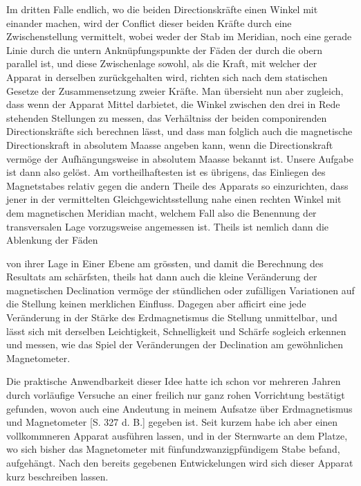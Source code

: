 Im dritten Falle endlich, wo die beiden Directionskräfte einen Winkel mit einander machen, wird der Conflict dieser beiden Kräfte durch eine Zwischenstellung vermittelt, wobei weder der Stab im Meridian, noch eine gerade Linie durch die untern Anknüpfungspunkte der Fäden der durch die obern parallel ist, und diese Zwischenlage sowohl, als die Kraft, mit welcher der Apparat in derselben zurückgehalten wird, richten sich nach dem statischen Gesetze der Zusammensetzung zweier Kräfte. Man übersieht nun aber zugleich, dass wenn der Apparat Mittel darbietet, die Winkel zwischen den drei in Rede stehenden Stellungen zu messen, das Verhältniss der beiden componirenden Directionskräfte sich berechnen lässt, und dass man folglich auch die magnetische Directionskraft in absolutem Maasse angeben kann, wenn die Directionskraft vermöge der Aufhängungsweise in absolutem Maasse bekannt ist. Unsere Aufgabe ist dann also gelöst. Am vortheilhaftesten ist es übrigens, das Einliegen des Magnetstabes relativ gegen die andern Theile des Apparats so einzurichten, dass jener in der vermittelten Gleichgewichtsstellung nahe einen rechten Winkel mit dem magnetischen Meridian macht, welchem Fall also die Benennung der transversalen Lage vorzugsweise angemessen ist. Theils ist nemlich dann die Ablenkung der Fäden
\par{}
\par\clearpage
{}
\noindent von ihrer Lage in Einer Ebene am grössten, und damit die Berechnung des Resultats am schärfsten, theils hat dann auch die kleine Veränderung der magnetischen Declination vermöge der stündlichen oder zufälligen Variationen auf die Stellung keinen merklichen Einfluss. Dagegen aber afficirt eine jede Veränderung in der Stärke des Erdmagnetismus die Stellung unmittelbar, und lässt sich mit derselben Leichtigkeit, Schnelligkeit und Schärfe sogleich erkennen und messen, wie das Spiel der Veränderungen der Declination am gewöhnlichen Magnetometer.

Die praktische Anwendbarkeit dieser Idee hatte ich schon vor mehreren Jahren durch vorläufige Versuche an einer freilich nur ganz rohen Vorrichtung bestätigt gefunden, wovon auch eine Andeutung in meinem Aufsatze über Erdmagnetismus und Magnetometer [S. 327 d. B.] gegeben ist. Seit kurzem habe ich aber einen vollkommneren Apparat ausführen lassen, und in der Sternwarte an dem Platze, wo sich bisher das Magnetometer mit fünfundzwanzigpfündigem Stabe befand, aufgehängt. Nach den bereits gegebenen Entwickelungen wird sich dieser Apparat kurz beschreiben lassen.

